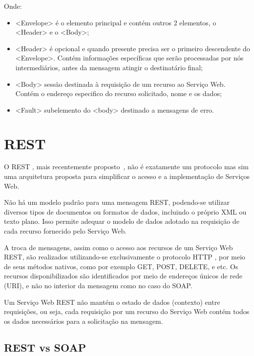 Onde:
\begin{itemize}
\item<Envelope> é o elemento principal e contém outros 2 elementos, o <Header> e o <Body>;
\item<Header> é opcional e quando presente precisa ser o primeiro descendente do <Envelope>. Contém informações específicas que serão processadas por nós intermediários, antes da mensagem atingir o destinatário final; 
\item<Body> sessão destinada à requisição de um recurso ao Serviço Web. Contém o endereço especifico do recurso solicitado, nome e os dados;
\item<Fault> subelemento  do <body> destinado a mensagens de erro.
\end{itemize}

\section{REST}
\label{sec:rest}

O REST , mais recentemente proposto~\cite{RTF}, não é exatamente um protocolo mas sim uma arquitetura proposta para simplificar o acesso e a implementação de Serviços Web. 
\par
Não há um modelo padrão para uma mensagem REST, podendo-se utilizar diversos tipos de documentos ou formatos de dados, incluindo o próprio XML ou texto plano. Isso permite adequar o modelo de dados adotado na requisição de cada recurso fornecido pelo Serviço Web.
\par
 A troca de mensagens, assim como o acesso aos recursos de um Serviço Web REST, são realizados utilizando-se exclusivamente o protocolo HTTP , por meio de seus métodos nativos, como por exemplo GET, POST, DELETE, e etc. Os recursos disponibilizados são identificados por meio de endereços únicos de rede (URI), e não no interior da mensagem como no caso do SOAP.
\par
 Um Serviço Web REST não mantém o estado de dados (contexto) entre requisições, ou seja, cada requisição por um recurso do Serviço Web contém todos os dados necessários para a solicitação na mensagem.


\subsection{REST vs SOAP}


